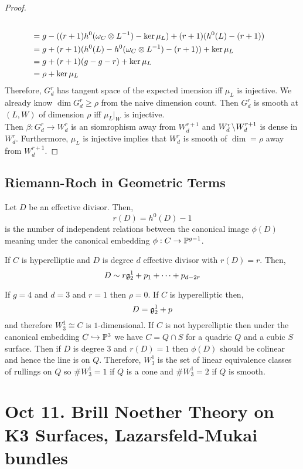 \documentclass[12pt]{article}
\begin{document}
\begin{proof}
\begin{align*}
\\
& = g - ((r+1) h^0(\omega_C \ot L^{-1}) - \ker{\mu_L}) + (r+1) (h^0(L) - (r+1))
\\
& = g + (r+1) (h^0(L) - h^0(\omega_C \ot L^{-1}) - (r+1)) + \ker{\mu_L}
\\
& = g + (r+1) (g - g - r) + \ker{\mu_L}
\\
& = \rho + \ker{\mu_L} 
\end{align*}
Therefore, $G^r_d$ has tangent space of the expected imension iff $\mu_L$ is injective. We already know $\dim{G^r_d} \ge \rho$ from the naive dimension count. Then $G^r_d$ is smooth at $(L, W)$ of dimension $\rho$ iff $\mu_L |_W$ is injective. 
\bigskip\\
Then $\beta : G^r_d \to W^r_d$ is an siomrophism away from $W^{r+1}_d$ and $W^r_d \sm W^{r+1}_d$ is dense in $W^r_d$. Furthermore, $\mu_L$ is injective implies that $W^r_d$ is smooth of $\dim = \rho$ away from $W_d^{r+1}$. 
\end{proof}

\subsection{Riemann-Roch in Geometric Terms}

Let $D$ be an effective divisor. Then,
\[ r(D) = h^0(D) - 1 \]
is the number of independent relations between the canonical image $\phi(D)$ meaning under the canonical embedding $\phi : C \to \P^{g-1}$.

\begin{example}
If $C$ is hyperelliptic and $D$ is degree $d$ effective divisor with $r(D) = r$. Then,
\[ D \sim r \g^1_2 + p_1 + \cdots + p_{d-2r} \]
\end{example}

\begin{example}
If $g = 4$ and $d = 3$ and $r = 1$ then $\rho = 0$. If $C$ is hyperelliptic then,
\[ D = \g^1_2 + p \]
and therefore $W^1_3 \cong C$ is $1$-dimensional. If $C$ is not hyperelliptic then under the canonical embedding $C \embed \P^3$ we have $C = Q \cap S$ for a quadric $Q$ and a cubic $S$ surface. Then if $D$ is degree $3$ and $r(D) = 1$ then $\phi(D)$ should be colinear and hence the line is on $Q$. Therefore, $W^1_3$ is the set of linear equivalence classes of rullings on $Q$ so $\# W^1_3 = 1$ if $Q$ is a cone and $\# W^1_3 = 2$ if $Q$ is smooth. 
\end{example}

\section{Oct 11. Brill Noether Theory on K3 Surfaces, Lazarsfeld-Mukai bundles}
\end{document}
